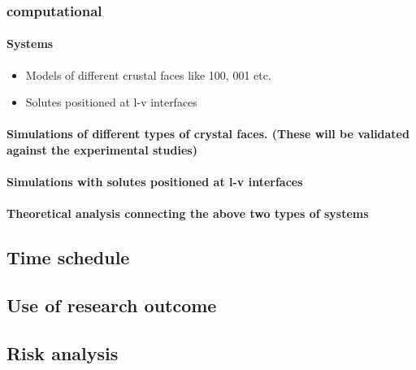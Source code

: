 \documentclass[a4paper,12pt,single,pdftex]{scrartcl}
\begin{document}
\label{ID_872435313}\subsubsection{computational}

\label{ID_1103117492}\paragraph{Systems}

\begin{itemize}
\label{ID_190203064}\item Models of different crustal faces like 100, 001 etc.
\label{ID_808283525}\item Solutes positioned at l-v interfaces
\end{itemize}
\label{ID_190203064}\label{ID_808283525}\label{ID_1619461814}\paragraph{Simulations of different types of crystal faces. (These will be validated against the experimental studies)}

\label{ID_1547495769}\paragraph{Simulations with solutes positioned at l-v interfaces}

\label{ID_1538917616}\paragraph{Theoretical analysis connecting the above two types of systems}

\label{ID_581300306}\subsection{Time schedule}

\label{ID_1195711759}\subsection{Use of research outcome}

\label{ID_1268337594}\subsection{Risk analysis}

\label{ID_392987275}\subsection{}
\end{document}
